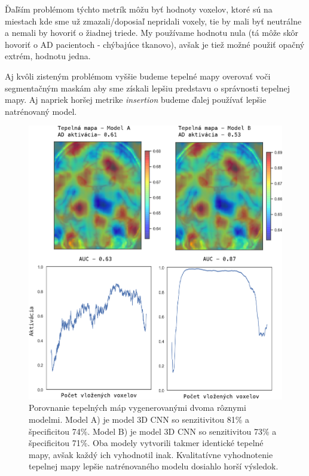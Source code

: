 Ďaľším problémom týchto metrík môžu byť hodnoty voxelov, ktoré sú na miestach kde sme už zmazali/doposiaľ nepridali voxely, tie by mali byť neutrálne a nemali by hovoriť o žiadnej triede. My používame hodnotu nula (tá môže skôr hovoriť o AD pacientoch - chýbajúce tkanovo), avšak je tiež možné použiť opačný extrém, hodnotu jedna.

Aj kvôli zisteným problémom vyššie budeme tepelné mapy overovať voči segmentačným maskám aby sme získali lepšiu predstavu o správnosti tepelnej mapy. Aj napriek horšej metrike \textit{insertion} budeme ďalej používať lepšie natrénovaný model.

\begin{figure}[h!]
    \centering
    \includegraphics[width=14cm]{assets/images/3d_cnn_heatmap_cmp.png}
    \caption{Porovnanie tepelných máp vygenerovanými dvoma rôznymi modelmi. Model A) je model 3D CNN so senzitivitou 81\% a špecificitou 74\%. Model B) je model 3D CNN so senzitivitou 73\% a špecificitou 71\%. Oba modely vytvorili takmer identické tepelné mapy, avšak každý ich vyhodnotil inak. Kvalitatívne vyhodnotenie tepelnej mapy lepšie natrénovaného modelu dosiahlo horší výsledok.}
    \label{fig:3d_cnn_heatmap_cmp}
\end{figure}

